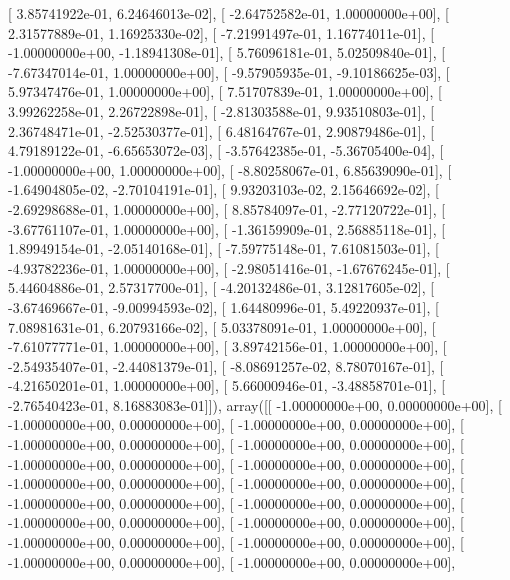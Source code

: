 \documentclass{article}
\begin{document}
       [  3.85741922e-01,   6.24646013e-02],
       [ -2.64752582e-01,   1.00000000e+00],
       [  2.31577889e-01,   1.16925330e-02],
       [ -7.21991497e-01,   1.16774011e-01],
       [ -1.00000000e+00,  -1.18941308e-01],
       [  5.76096181e-01,   5.02509840e-01],
       [ -7.67347014e-01,   1.00000000e+00],
       [ -9.57905935e-01,  -9.10186625e-03],
       [  5.97347476e-01,   1.00000000e+00],
       [  7.51707839e-01,   1.00000000e+00],
       [  3.99262258e-01,   2.26722898e-01],
       [ -2.81303588e-01,   9.93510803e-01],
       [  2.36748471e-01,  -2.52530377e-01],
       [  6.48164767e-01,   2.90879486e-01],
       [  4.79189122e-01,  -6.65653072e-03],
       [ -3.57642385e-01,  -5.36705400e-04],
       [ -1.00000000e+00,   1.00000000e+00],
       [ -8.80258067e-01,   6.85639090e-01],
       [ -1.64904805e-02,  -2.70104191e-01],
       [  9.93203103e-02,   2.15646692e-02],
       [ -2.69298688e-01,   1.00000000e+00],
       [  8.85784097e-01,  -2.77120722e-01],
       [ -3.67761107e-01,   1.00000000e+00],
       [ -1.36159909e-01,   2.56885118e-01],
       [  1.89949154e-01,  -2.05140168e-01],
       [ -7.59775148e-01,   7.61081503e-01],
       [ -4.93782236e-01,   1.00000000e+00],
       [ -2.98051416e-01,  -1.67676245e-01],
       [  5.44604886e-01,   2.57317700e-01],
       [ -4.20132486e-01,   3.12817605e-02],
       [ -3.67469667e-01,  -9.00994593e-02],
       [  1.64480996e-01,   5.49220937e-01],
       [  7.08981631e-01,   6.20793166e-02],
       [  5.03378091e-01,   1.00000000e+00],
       [ -7.61077771e-01,   1.00000000e+00],
       [  3.89742156e-01,   1.00000000e+00],
       [ -2.54935407e-01,  -2.44081379e-01],
       [ -8.08691257e-02,   8.78070167e-01],
       [ -4.21650201e-01,   1.00000000e+00],
       [  5.66000946e-01,  -3.48858701e-01],
       [ -2.76540423e-01,   8.16883083e-01]]), array([[ -1.00000000e+00,   0.00000000e+00],
       [ -1.00000000e+00,   0.00000000e+00],
       [ -1.00000000e+00,   0.00000000e+00],
       [ -1.00000000e+00,   0.00000000e+00],
       [ -1.00000000e+00,   0.00000000e+00],
       [ -1.00000000e+00,   0.00000000e+00],
       [ -1.00000000e+00,   0.00000000e+00],
       [ -1.00000000e+00,   0.00000000e+00],
       [ -1.00000000e+00,   0.00000000e+00],
       [ -1.00000000e+00,   0.00000000e+00],
       [ -1.00000000e+00,   0.00000000e+00],
       [ -1.00000000e+00,   0.00000000e+00],
       [ -1.00000000e+00,   0.00000000e+00],
       [ -1.00000000e+00,   0.00000000e+00],
       [ -1.00000000e+00,   0.00000000e+00],
       [ -1.00000000e+00,   0.00000000e+00],
       [ -1.00000000e+00,   0.00000000e+00],
\end{document}
